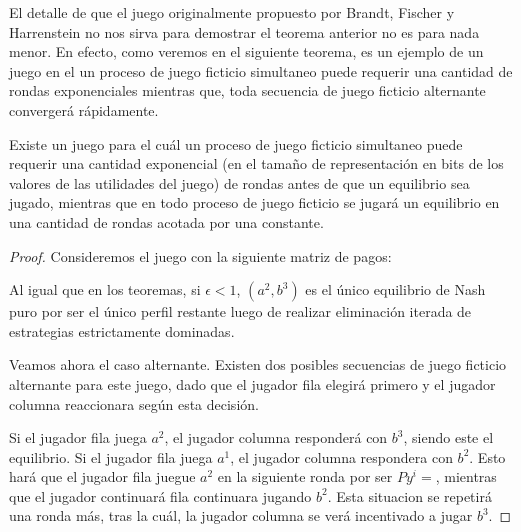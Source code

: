 El detalle de que el juego originalmente propuesto por Brandt, Fischer y Harrenstein no nos sirva para demostrar el teorema anterior no es para nada menor. En efecto, como veremos en el siguiente teorema, es un ejemplo de un juego en el un proceso de juego ficticio simultaneo puede requerir una cantidad de rondas exponenciales mientras que, toda secuencia de juego ficticio alternante convergerá rápidamente.

\begin{theorem}
    Existe un juego para el cuál un proceso de juego ficticio simultaneo puede requerir una cantidad exponencial (en el tamaño de representación en bits de los valores de las utilidades del juego) de rondas antes de que un equilibrio sea jugado, mientras que en todo proceso de juego ficticio se jugará un equilibrio en una cantidad de rondas acotada por una constante.
\end{theorem}


\begin{proof}
    Consideremos el juego con la siguiente matriz de pagos:

    

    Al igual que en los teoremas, si $\epsilon < 1$, $(a^2, b^3)$ es el único equilibrio de Nash puro por ser el único perfil restante luego de realizar eliminación iterada de estrategias estrictamente dominadas.




    Veamos ahora el caso alternante. Existen dos posibles secuencias de juego ficticio alternante para este juego, dado que el jugador fila elegirá primero y el jugador columna reaccionara según esta decisión.

    Si el jugador fila juega $a^2$, el jugador columna responderá con $b^3$, siendo este el equilibrio.
    Si el jugador fila juega $a^1$, el jugador columna respondera con $b^2$. Esto hará que el jugador fila juegue $a^2$ en la siguiente ronda por ser $Py^i = $, mientras que el jugador continuará fila continuara jugando $b^2$. Esta situacion se repetirá una ronda más, tras la cuál, la jugador columna se verá incentivado a jugar $b^3$.


\end{proof}
